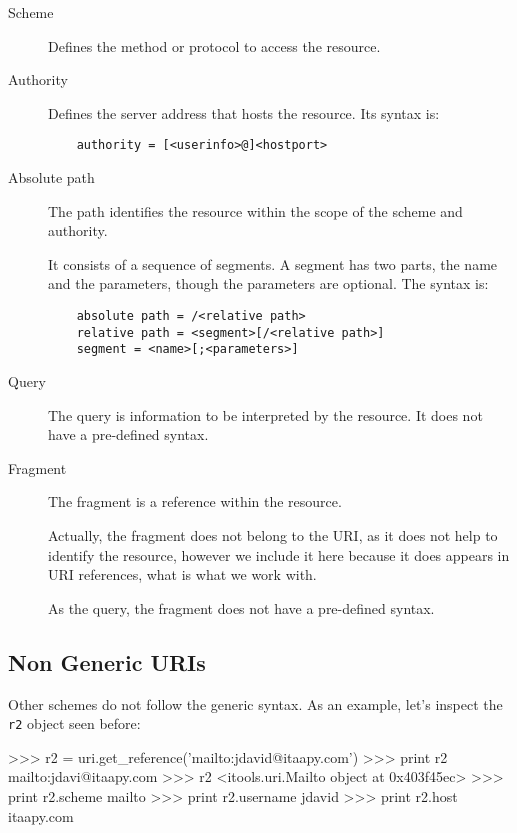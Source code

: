 \begin{description}
  \item [Scheme] Defines the method or protocol to access the resource.

  \item [Authority] Defines the server address that hosts the resource.
    Its syntax is:

\begin{verbatim}
    authority = [<userinfo>@]<hostport>
\end{verbatim}

  \item [Absolute path] The path identifies the resource within the scope
    of the scheme and authority.

    It consists of a sequence of segments. A segment has two parts, the
    name and the parameters, though the parameters are optional. The syntax is:

\begin{verbatim}
    absolute path = /<relative path>
    relative path = <segment>[/<relative path>]
    segment = <name>[;<parameters>]
\end{verbatim}

  \item [Query] The query is information to be interpreted by the resource.
    It does not have a pre-defined syntax.

  \item [Fragment] The fragment is a reference within the resource.

    Actually, the fragment does not belong to the URI, as it does not help
    to identify the resource, however we include it here because it does
    appears in URI references, what is what we work with.

    As the query, the fragment does not have a pre-defined syntax.
\end{description}


\subsection{Non Generic URIs}

Other schemes do not follow the generic syntax. As an example, let's inspect
the {\tt r2} object seen before:

\begin{code}
    >>> r2 = uri.get_reference('mailto:jdavid@itaapy.com')
    >>> print r2
    mailto:jdavi@itaapy.com
    >>> r2
    <itools.uri.Mailto object at 0x403f45ec>
    >>> print r2.scheme
    mailto
    >>> print r2.username
    jdavid
    >>> print r2.host    
    itaapy.com
\end{code}


